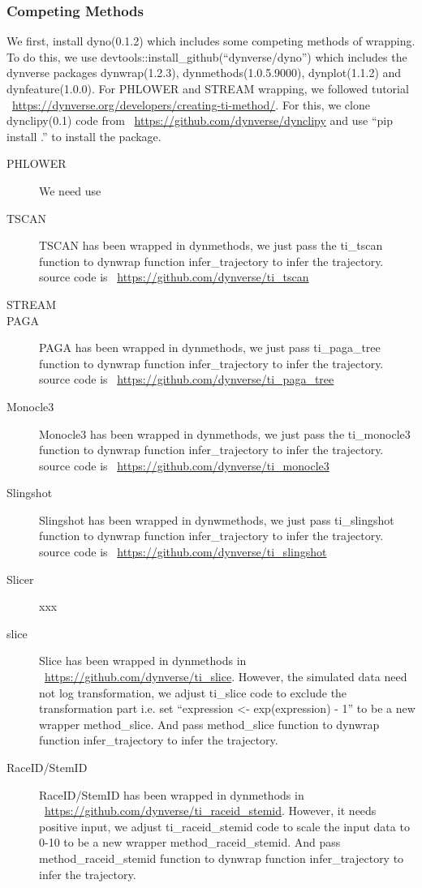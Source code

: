 \subsubsection{Competing Methods}
	We first, install dyno(0.1.2) which includes some competing methods of wrapping. To do this, we use devtools::install\_github(``dynverse/dyno'') which includes the dynverse packages dynwrap(1.2.3),  dynmethods(1.0.5.9000), dynplot(1.1.2) and dynfeature(1.0.0). For PHLOWER and STREAM wrapping, we followed tutorial ~\url{https://dynverse.org/developers/creating-ti-method/}. For this, we clone dynclipy(0.1) code from ~\url{https://github.com/dynverse/dynclipy} and use ``pip install .'' to install the package.
\begin{description}
	\item[PHLOWER]
	We need use 
	\item[TSCAN]
	TSCAN has been wrapped in dynmethods, we just pass the ti\_tscan function to dynwrap function infer\_trajectory to infer the trajectory. source code is ~\url{https://github.com/dynverse/ti\_tscan}
	\item[STREAM]
	\item[PAGA] 
	PAGA has been wrapped in dynmethods, we just pass ti\_paga\_tree function to dynwrap function infer\_trajectory to infer the trajectory. source code is ~\url{https://github.com/dynverse/ti\_paga\_tree}
	\item[Monocle3]
	Monocle3 has been wrapped in dynmethods, we just pass the ti\_monocle3 function to dynwrap function infer\_trajectory to infer the trajectory. source code is ~\url{https://github.com/dynverse/ti\_monocle3}
	\item[Slingshot]
	Slingshot has been wrapped in dynwmethods, we just pass ti\_slingshot function to dynwrap function infer\_trajectory to infer the trajectory. source code is ~\url{https://github.com/dynverse/ti\_slingshot}
	\item[Slicer]
	xxx
	\item[slice]
	Slice has been wrapped in dynmethods in ~\url{https://github.com/dynverse/ti\_slice}. However, the simulated data need not log transformation, we adjust ti\_slice code to exclude the transformation part i.e. set ``expression <- exp(expression) - 1'' to be a new wrapper method\_slice. And pass method\_slice function to dynwrap function infer\_trajectory to infer the trajectory.
	\item[RaceID/StemID]
	RaceID/StemID has been wrapped in dynmethods in ~\url{https://github.com/dynverse/ti\_raceid\_stemid}. However, it needs positive input, we adjust ti\_raceid\_stemid code to scale the input data to 0-10 to be a new wrapper method\_raceid\_stemid. And pass method\_raceid\_stemid function to dynwrap function infer\_trajectory to infer the trajectory.

\end{description}
